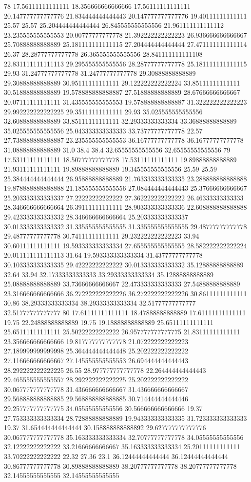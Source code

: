 78 17.56111111111111 18.356666666666666 17.56111111111111 20.147777777777776 21.834444444444443 20.147777777777776 19.40111111111111 25.57 25.57 25.204444444444444 26.845555555555556 21.961111111111112 23.235555555555553 20.00777777777778 21.392222222222223 26.936666666666667 25.70888888888889 25.181111111111115 27.204444444444444 27.471111111111114 26.37 28.28777777777778 26.365555555555556 28.841111111111108 22.831111111111113 29.295555555555556 28.28777777777778 25.181111111111115 29.93 31.24777777777778 31.24777777777778 29.30888888888889 29.30888888888889 30.95111111111111 29.122222222222224 33.85111111111111 30.51888888888889 19.578888888888887 27.51888888888889 28.67666666666667 20.07111111111111 31.435555555555553 19.578888888888887 31.322222222222223 29.992222222222225 29.35111111111111 29.93 35.025555555555556 32.60888888888889 33.85111111111111 32.29333333333334 33.36888888888889 35.025555555555556 25.043333333333333 33.73777777777778 22.57 27.738888888888887 23.235555555555553 36.16777777777778 36.16777777777778 31.08888888888889 31.0 38.4 38.4 32.65555555555556 32.65555555555556
79 17.53111111111111 18.50777777777778 17.53111111111111 19.89888888888889 21.93111111111111 19.89888888888889 19.345555555555556 25.59 25.59 25.384444444444444 26.95888888888889 21.763333333333335 23.288888888888888 19.878888888888888 21.185555555555556 27.084444444444443 25.37666666666667 25.203333333333337 27.22222222222222 27.362222222222222 26.46333333333333 28.346666666666664 26.39111111111111 28.903333333333336 22.608888888888888 29.423333333333332 28.346666666666664 25.203333333333337 30.013333333333332 31.335555555555555 31.335555555555555 29.48777777777778 29.48777777777778 30.74111111111111 29.232222222222223 33.94 30.60111111111111 19.593333333333334 27.655555555555555 28.582222222222224 20.011111111111113 31.64 19.593333333333334 31.43777777777778 30.103333333333335 29.42222222222222 30.013333333333332 35.12888888888889 32.64 33.94 32.17333333333333 33.29333333333334 35.12888888888889 25.08888888888889 33.73666666666667 22.473333333333333 27.54888888888889 23.316666666666666 36.272222222222226 36.272222222222226 30.86111111111111 30.86 38.29333333333334 38.29333333333334 32.51777777777777 32.51777777777777
80 17.61111111111111 18.47888888888889 17.61111111111111 19.75 22.24888888888889 19.75 19.18888888888889 25.65111111111111 25.65111111111111 25.50222222222222 26.957777777777775 21.83111111111111 23.356666666666666 19.817777777777778 21.072222222222223 27.189999999999998 25.364444444444448 25.202222222222222 27.116666666666667 27.145555555555553 26.694444444444443 28.292222222222225 26.55 28.977777777777778 22.264444444444443 29.465555555555557 28.292222222222225 25.202222222222222 30.067777777777778 31.436666666666667 31.436666666666667 29.568888888888885 29.568888888888885 30.714444444444446 29.257777777777775 34.05555555555556 30.566666666666666 19.37 27.753333333333334 28.72888888888889 19.943333333333335 31.723333333333333 19.37 31.654444444444444 30.158888888888892 29.627777777777776 30.067777777777778 35.163333333333334 32.70777777777778 34.05555555555556 32.12222222222222 33.21666666666667 35.163333333333334 25.20111111111111 33.70222222222222 22.32 27.36 23.1 36.12444444444444 36.12444444444444 30.86777777777778 30.89888888888889 38.20777777777778 38.20777777777778 32.14555555555555 32.14555555555555
